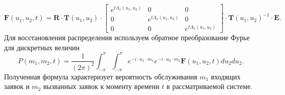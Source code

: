 \begin{equation*}
	\boldsymbol{F}(u_{1},u_{2},t)=\boldsymbol{R} \cdot \boldsymbol{T}(u_{1},u_{2})\cdot \begin{bmatrix}
		e^{t \Lambda_{1}(u_{1},u_{2})} & 0 &  0\\
		0 & e^{t \Lambda_{2}(u_{1},u_{2})} & 0\\
		0 & 0 &	e^{t \Lambda_{3}(u_{1},u_{2})}
	\end{bmatrix} \cdot \boldsymbol{T}(u_{1},u_{2})^{-1} \cdot \boldsymbol{E}.
\end{equation*}
Для восстановления распределения используем обратное преобразование Фурье для дискретных величин
\begin{equation} \label{distr_simple_twodim}
	P(m_{1},m_{2},t) = \dfrac{1}{(2\pi)^2}\int_{-\pi}^{\pi}\int_{-\pi}^{\pi} e^{-i \cdot u_{1} \cdot m_{1}} e^{-i \cdot u_{2} \cdot m_{2}}\boldsymbol{F}(u_{1},u_{2},t)du_{2}du_{2}.
\end{equation}
Полученная формула характеризует вероятность обслуживания $m_{1}$ входящих заявок и $m_{2}$ вызванных заявок к моменту времени $t$ в рассматриваемой системе.

